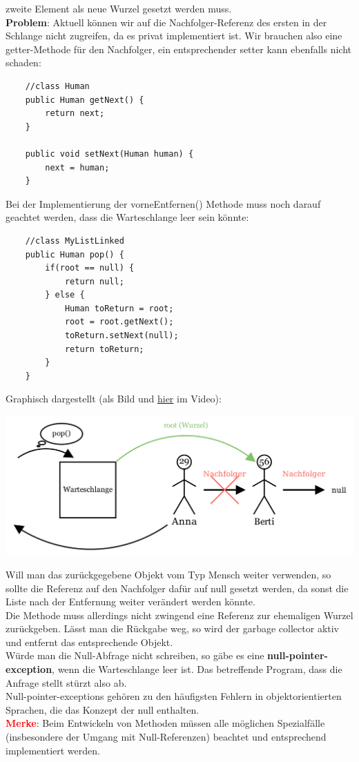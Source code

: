 \documentclass{article}
\begin{document}
zweite Element als neue Wurzel gesetzt werden muss. \\
\textbf{Problem}: Aktuell können wir auf die Nachfolger-Referenz des ersten in der Schlange nicht zugreifen, da 
es privat implementiert ist. Wir brauchen also eine getter-Methode für den Nachfolger, ein entsprechender setter kann ebenfalls nicht schaden:
\begin{verbatim}
    //class Human
    public Human getNext() {
        return next;
    }

    public void setNext(Human human) {
        next = human;
    }
\end{verbatim}
Bei der Implementierung der vorneEntfernen() Methode muss noch darauf geachtet werden, dass die Warteschlange 
leer sein könnte:
\begin{verbatim}
    //class MyListLinked 
    public Human pop() {
        if(root == null) {
            return null;
        } else {
            Human toReturn = root;
            root = root.getNext();
            toReturn.setNext(null);
            return toReturn;
        }
    }
\end{verbatim}
Graphisch dargestellt (als Bild und \href{https://youtu.be/ceQII7Bn9ts}{hier} im Video):
\begin{center}
    \includegraphics[scale = 0.2]{../../media/linked_list_pop.png}
\end{center}
Will man das zurückgegebene Objekt vom Typ Mensch weiter verwenden, so sollte die Referenz auf den 
Nachfolger dafür auf null gesetzt werden, da sonst die Liste nach der Entfernung weiter verändert werden könnte. \\
Die Methode muss allerdings nicht zwingend eine Referenz zur ehemaligen Wurzel zurückgeben. Lässt man die Rückgabe weg, so wird der garbage collector aktiv und entfernt das entsprechende Objekt. \\
Würde man die Null-Abfrage nicht schreiben, so gäbe es eine \textbf{null-pointer-exception}, wenn die Warteschlange 
leer ist. Das betreffende Program, dass die Anfrage stellt stürzt also ab. \\
Null-pointer-exceptions gehören zu den häufigsten Fehlern in objektorientierten Sprachen, die das Konzept der 
null enthalten. \\
\textbf{\textcolor{red}{Merke}}: Beim Entwickeln von Methoden müssen alle möglichen Spezialfälle (insbesondere der
Umgang mit Null-Referenzen) beachtet und entsprechend implementiert werden. \\
\end{document}
